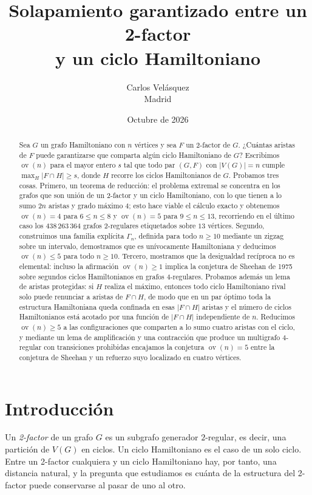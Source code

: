 \documentclass[11pt,a4paper]{article}
\title{Solapamiento garantizado entre un 2-factor\\ y un ciclo Hamiltoniano}
\author{Carlos Velásquez\\ \small Madrid}
\date{Octubre de 2026}
\theoremstyle{definition}
\theoremstyle{remark}
\newcommand{\ov}{\operatorname{ov}}
\begin{document}
\maketitle

\begin{abstract}
Sea $G$ un grafo Hamiltoniano con $n$ vértices y sea $F$ un 2-factor de $G$. ¿Cuántas aristas de $F$ puede garantizarse que comparta algún ciclo Hamiltoniano de $G$? Escribimos $\ov(n)$ para el mayor entero $s$ tal que todo par $(G,F)$ con $|V(G)|=n$ cumple $\max_{H}|F\cap H|\ge s$, donde $H$ recorre los ciclos Hamiltonianos de $G$. Probamos tres cosas. Primero, un teorema de reducción: el problema extremal se concentra en los grafos que son unión de un 2-factor y un ciclo Hamiltoniano, con lo que tienen a lo sumo $2n$ aristas y grado máximo $4$; esto hace viable el cálculo exacto y obtenemos $\ov(n)=4$ para $6\le n\le8$ y $\ov(n)=5$ para $9\le n\le13$, recorriendo en el último caso los $438\,263\,364$ grafos $2$-regulares etiquetados sobre $13$ vértices. Segundo, construimos una familia explícita $\Gamma_n$, definida para todo $n\ge10$ mediante un zigzag sobre un intervalo, demostramos que es unívocamente Hamiltoniana y deducimos $\ov(n)\le5$ para todo $n\ge10$. Tercero, mostramos que la desigualdad recíproca no es elemental: incluso la afirmación $\ov(n)\ge1$ implica la conjetura de Sheehan de 1975 sobre segundos ciclos Hamiltonianos en grafos $4$-regulares. Probamos además un lema de aristas protegidas: si $H$ realiza el máximo, entonces todo ciclo Hamiltoniano rival solo puede renunciar a aristas de $F\cap H$, de modo que en un par óptimo toda la estructura Hamiltoniana queda confinada en esas $|F\cap H|$ aristas y el número de ciclos Hamiltonianos está acotado por una función de $|F\cap H|$ independiente de $n$. Reducimos $\ov(n)\ge5$ a las configuraciones que comparten a lo sumo cuatro aristas con el ciclo, y mediante un lema de amplificación y una contracción que produce un multigrafo $4$-regular con transiciones prohibidas encajamos la conjetura $\ov(n)=5$ entre la conjetura de Sheehan y un refuerzo suyo localizado en cuatro vértices.
\end{abstract}

\section{Introducción}\label{sec:intro}

Un \emph{2-factor} de un grafo $G$ es un subgrafo generador $2$-regular, es decir, una partición de $V(G)$ en ciclos. Un ciclo Hamiltoniano es el caso de un solo ciclo. Entre un 2-factor cualquiera y un ciclo Hamiltoniano hay, por tanto, una distancia natural, y la pregunta que estudiamos es cuánta de la estructura del 2-factor puede conservarse al pasar de uno al otro.
\end{document}
